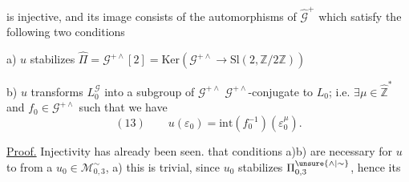
is injective, and its image consists of the
automorphisms of $\widehat{\mathcal{G}}^{+}$ which satisfy the following
two conditions

a) $u$ stabilizes $\widehat{\Pi}=\mathcal{G}^{+\wedge}[2]
=\mathrm{Ker}(\mathcal{G}^{+\wedge}\longrightarrow\mathrm{Sl}(2,\mathbb{Z}/2\mathbb{Z}))$

b) $u$ transforms $L_{0}^{\mathcal{G}}$ into a subgroup of $\mathcal{G}^{+\wedge}$
$\mathcal{G}^{+\wedge}$-conjugate to $L_{0}$; i.e.
$\exists\mu\in\widehat{\mathbb{Z}}^{*}$ and $f_{0}\in\mathcal{G}^{+\wedge}$
such that we have
\[
(13)\qquad u(\varepsilon_{0})=\mathrm{int}(f_{0}^{-1})(\varepsilon_{0}^{\mu}).
\]

\uline{Proof.} Injectivity has already been seen.
that conditions a)b) are necessary for
$u$ to 
from a $u_{0}\in\mathcal{M}_{0,3}^{\sim}$,
 a) this is trivial, since $u_{0}$ stabilizes
$\Pi_{0,3}^{\unsure{\wedge|\sim}}$, hence its



